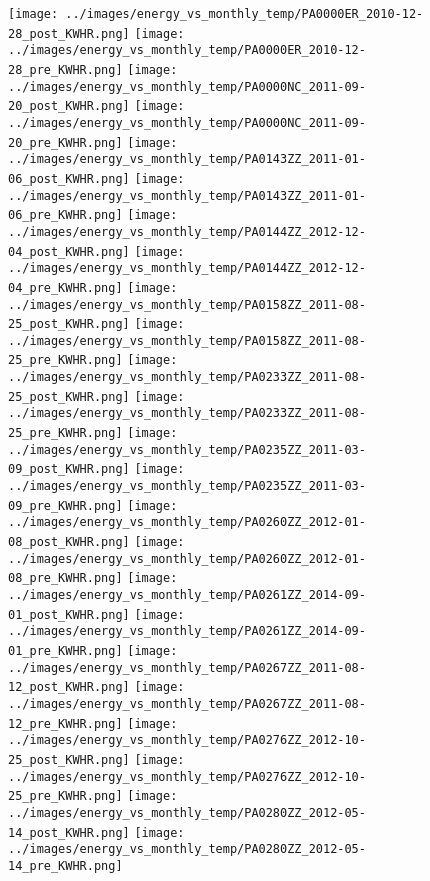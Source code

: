 \clearpage
\begin{figure}
\centering
\texttt{[image: ../images/energy\_vs\_monthly\_temp/PA0000ER\_2010-12-28\_post\_KWHR.png]}
\texttt{[image: ../images/energy\_vs\_monthly\_temp/PA0000ER\_2010-12-28\_pre\_KWHR.png]}
\texttt{[image: ../images/energy\_vs\_monthly\_temp/PA0000NC\_2011-09-20\_post\_KWHR.png]}
\texttt{[image: ../images/energy\_vs\_monthly\_temp/PA0000NC\_2011-09-20\_pre\_KWHR.png]}
\texttt{[image: ../images/energy\_vs\_monthly\_temp/PA0143ZZ\_2011-01-06\_post\_KWHR.png]}
\texttt{[image: ../images/energy\_vs\_monthly\_temp/PA0143ZZ\_2011-01-06\_pre\_KWHR.png]}
\texttt{[image: ../images/energy\_vs\_monthly\_temp/PA0144ZZ\_2012-12-04\_post\_KWHR.png]}
\texttt{[image: ../images/energy\_vs\_monthly\_temp/PA0144ZZ\_2012-12-04\_pre\_KWHR.png]}
\texttt{[image: ../images/energy\_vs\_monthly\_temp/PA0158ZZ\_2011-08-25\_post\_KWHR.png]}
\texttt{[image: ../images/energy\_vs\_monthly\_temp/PA0158ZZ\_2011-08-25\_pre\_KWHR.png]}
\texttt{[image: ../images/energy\_vs\_monthly\_temp/PA0233ZZ\_2011-08-25\_post\_KWHR.png]}
\texttt{[image: ../images/energy\_vs\_monthly\_temp/PA0233ZZ\_2011-08-25\_pre\_KWHR.png]}
\texttt{[image: ../images/energy\_vs\_monthly\_temp/PA0235ZZ\_2011-03-09\_post\_KWHR.png]}
\texttt{[image: ../images/energy\_vs\_monthly\_temp/PA0235ZZ\_2011-03-09\_pre\_KWHR.png]}
\texttt{[image: ../images/energy\_vs\_monthly\_temp/PA0260ZZ\_2012-01-08\_post\_KWHR.png]}
\texttt{[image: ../images/energy\_vs\_monthly\_temp/PA0260ZZ\_2012-01-08\_pre\_KWHR.png]}
\texttt{[image: ../images/energy\_vs\_monthly\_temp/PA0261ZZ\_2014-09-01\_post\_KWHR.png]}
\texttt{[image: ../images/energy\_vs\_monthly\_temp/PA0261ZZ\_2014-09-01\_pre\_KWHR.png]}
\texttt{[image: ../images/energy\_vs\_monthly\_temp/PA0267ZZ\_2011-08-12\_post\_KWHR.png]}
\texttt{[image: ../images/energy\_vs\_monthly\_temp/PA0267ZZ\_2011-08-12\_pre\_KWHR.png]}
\texttt{[image: ../images/energy\_vs\_monthly\_temp/PA0276ZZ\_2012-10-25\_post\_KWHR.png]}
\texttt{[image: ../images/energy\_vs\_monthly\_temp/PA0276ZZ\_2012-10-25\_pre\_KWHR.png]}
\texttt{[image: ../images/energy\_vs\_monthly\_temp/PA0280ZZ\_2012-05-14\_post\_KWHR.png]}
\texttt{[image: ../images/energy\_vs\_monthly\_temp/PA0280ZZ\_2012-05-14\_pre\_KWHR.png]}
\end{figure}
